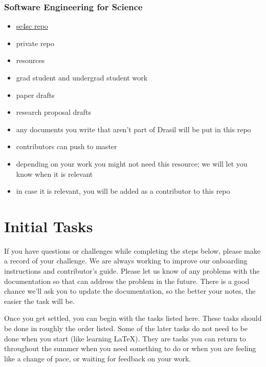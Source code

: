\documentclass[12pt]{article}
\begin{document}
\subsubsection{Software Engineering for Science}
\begin{itemize}
\item \href{https://gitlab.cas.mcmaster.ca/SEforSC/se4sc} {se4sc repo}
\item private repo
\item resources 
\item grad student and undergrad student work
\item paper drafts
\item research proposal drafts
\item any documents you write that aren't part of Drasil will be put in this repo
\item contributors can push to master
\item depending on your work you might not need this resource; we will let you
know when it is relevant
\item in case it is relevant, you will be added as a contributor to this repo
\end{itemize}

\section{Initial Tasks} \label{SecInitialTasks}

If you have questions or challenges while completing the steps below, please
make a record of your challenge.  We are always working to improve our
onboarding instructions and contributor's guide.  Please let us know of any
problems with the documentation so that can address the problem in the future.
There is a good chance we'll ask you to update the documentation, so the better
your notes, the easier the task will be.

Once you get settled, you can begin with the tasks listed here.  These tasks
should be done in roughly the order listed.  Some of the later tasks do not need
to be done when you start (like learning LaTeX).  They are tasks you can return
to throughout the summer when you need something to do or when you are feeling
like a change of pace, or waiting for feedback on your work.
\end{document}
